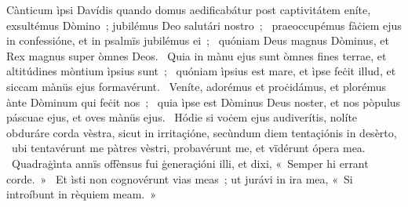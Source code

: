 { Cànticum ìpsi Davídis quando domus aedificabátur post captivitátem}
{%
eníte, exsultémus Dòmino~; jubilémus Deo salutári nostro~; 
~praeoccupémus fàċiem ejus in confessióne, et in psalmïs jubilémus ei~; 
~quóniam Deus magnus Dòminus, et Rex magnus super òmnes Deos. 
~Quia in mànu ejus sunt òmnes fines terrae, et altitúdines mòntium ìpsius sunt~; 
~quóniam ìpsius est mare, et ìpse feċit illud, et siccam mànüs ejus formavérunt. 
~Veníte, adorémus et proċidámus, et plorémus ànte Dòminum qui feċit nos~; 
~quia ìpse est Dòminus Deus noster, et nos pòpulus páscuae ejus, et oves mànüs ejus. 
~Hódie si voċem ejus audiverítis, nolíte obduráre corda vèstra, sicut in irritaçióne, secùndum diem tentaçiónis in desèrto, 
~ubi tentavérunt me pàtres vèstri, probavérunt me, et vïdérunt ópera mea. 
~Quadraġìnta annïs offènsus fui ġeneraçióni illi, et dixi, «~Semper hi errant corde.~»
~Et ìsti non cognovérunt vias meas~; ut jurávi in ira mea, «~Si introíbunt in rèquiem meam.~»
}
